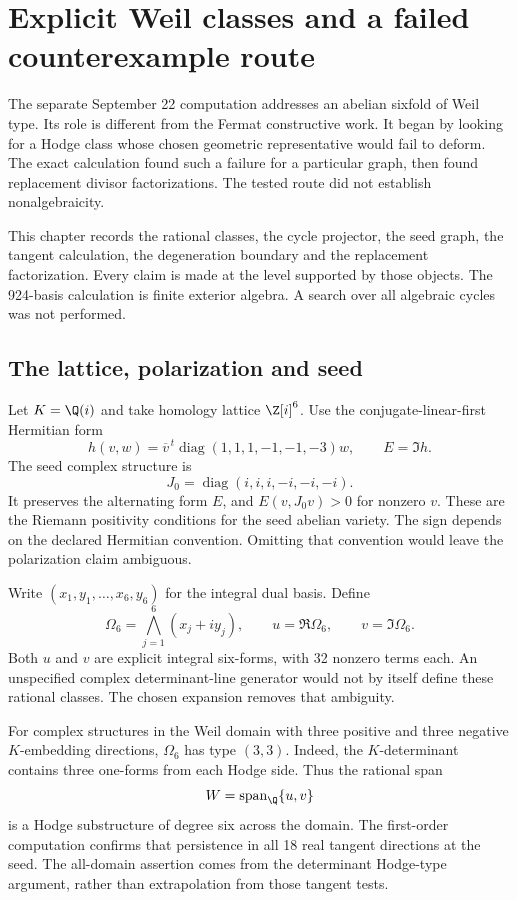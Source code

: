 \chapter{Explicit Weil classes and a failed counterexample route}
The separate September 22 computation addresses an abelian sixfold of Weil type. Its role is different from the Fermat constructive work. It began by looking for a Hodge class whose chosen geometric representative would fail to deform. The exact calculation found such a failure for a particular graph, then found replacement divisor factorizations. The tested route did not establish nonalgebraicity.

This chapter records the rational classes, the cycle projector, the seed graph, the tangent calculation, the degeneration boundary and the replacement factorization. Every claim is made at the level supported by those objects. The 924-basis calculation is finite exterior algebra. A search over all algebraic cycles was not performed.

\section{The lattice, polarization and seed}
Let $K=\Q(i)$ and take homology lattice $\Z[i]^6$. Use the conjugate-linear-first Hermitian form
\[
h(v,w)=\overline v^{\,t}\operatorname{diag}(1,1,1,-1,-1,-3)w,
\qquad E=\Im h.
\]
The seed complex structure is
\[
J_0=\operatorname{diag}(i,i,i,-i,-i,-i).
\]
It preserves the alternating form $E$, and $E(v,J_0v)>0$ for nonzero $v$. These are the Riemann positivity conditions for the seed abelian variety. The sign depends on the declared Hermitian convention. Omitting that convention would leave the polarization claim ambiguous.

Write $(x_1,y_1,\ldots,x_6,y_6)$ for the integral dual basis. Define
\[
\Omega_6=\bigwedge_{j=1}^{6}(x_j+iy_j),\qquad
u=\Re\Omega_6,\qquad v=\Im\Omega_6.
\]
Both $u$ and $v$ are explicit integral six-forms, with 32 nonzero terms each. An unspecified complex determinant-line generator would not by itself define these rational classes. The chosen expansion removes that ambiguity.

For complex structures in the Weil domain with three positive and three negative $K$-embedding directions, $\Omega_6$ has type $(3,3)$. Indeed, the $K$-determinant contains three one-forms from each Hodge side. Thus the rational span
\[
W=\Span_{\Q}\{u,v\}
\]
is a Hodge substructure of degree six across the domain. The first-order computation confirms that persistence in all 18 real tangent directions at the seed. The all-domain assertion comes from the determinant Hodge-type argument, rather than extrapolation from those tangent tests.

